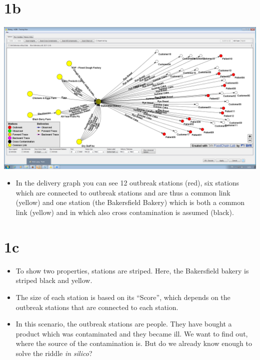 \documentclass[10pt]{beamer}
\begin{document}
\section{1b}
\begin{frame}
	\begin{center}
  		\includegraphics[height=0.6\textheight]{1b.png}
	\end{center}
	\begin{itemize}
		\item In the delivery graph you can see 12 outbreak stations (red), six stations which are connected to outbreak stations and are thus a common link (yellow) and one station (the Bakersfield Bakery) which is both a common link (yellow) and in which also cross contamination is assumed (black).
	\end{itemize}
\end{frame}

\section{1c}
\begin{frame}
	\begin{itemize}
		\item To show two properties, stations are striped. Here, the Bakersfield bakery is striped  black and yellow.
		\item The size of each station is based on its ``Score'', which depends on the outbreak stations that are connected to each station.
		\item In this scenario, the outbreak stations are people. They have bought a product which was contaminated and they became ill. We want to find out, where the source of the contamination is. But do we already know enough to solve the riddle \textit{in silico}?
	\end{itemize}
\end{frame}
\end{document}
